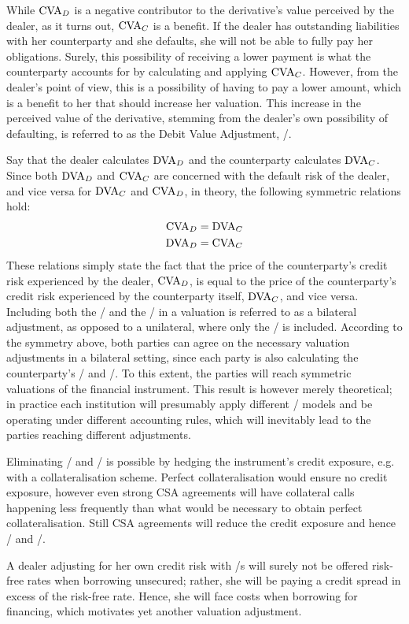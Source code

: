 \documentclass[main.tex]{subfiles}
\begin{document}
        While $\CVA/_{D}$ is a negative contributor to the derivative's value perceived by the dealer, 
        as it turns out, $\CVA/_{C}$ is a benefit.
        If the dealer has outstanding liabilities with her counterparty
        and she defaults, she will not be able to fully pay her obligations. 
        Surely, this possibility of receiving a lower payment is what the counterparty accounts for 
        by calculating and applying $\CVA/_{C}$.
        However, from the dealer's point of view, this is a possibility of having to pay a lower amount,
        which is a benefit to her that should increase her valuation.
        This increase in the perceived value of the derivative,
        stemming from the dealer's own possibility of defaulting, 
        is referred to as the Debit Value Adjustment, \DVA/.

        Say that the dealer calculates $\DVA/_{D}$ and the counterparty calculates $\DVA/_{C}$.
        Since both $\DVA/_{D}$ and $\CVA/_{C}$ are concerned with the default risk of the dealer,
        and vice versa for $\DVA/_{C}$ and $\CVA/_{D}$, in theory, the following symmetric relations hold:
            \begin{align*}
                \CVA/_{D} &= \DVA/_{C} \\
                \DVA/_{D} &= \CVA/_{C}
            \end{align*}
        These relations simply state the fact that
        the price of the counterparty's credit risk experienced by the dealer, $\CVA/_{D}$,
        is equal to the price of the counterparty's credit risk 
        experienced by the counterparty itself, $\DVA/_{C}$, and vice versa.
        Including both the \CVA/ and the \DVA/ in a valuation is referred to as a bilateral adjustment,
        as opposed to a unilateral, where only the \CVA/ is included.
        According to the symmetry above,
        both parties can agree on the necessary valuation adjustments in a bilateral setting,
        since each party is also calculating the counterparty's \CVA/ and \DVA/.
        To this extent, the parties will reach symmetric valuations of the financial instrument. 
        This result is however merely theoretical; 
        in practice each institution will presumably apply different \CVA/ models
        and be operating under different accounting rules, 
        which will inevitably lead to the parties reaching different adjustments. 
        
        Eliminating \CVA/ and \DVA/ is possible by hedging the instrument's credit exposure,
        e.g. with a collateralisation scheme. 
        Perfect collateralisation would ensure no credit exposure,
        however even strong CSA agreements will have collateral calls happening less frequently
        than what would be necessary to obtain perfect collateralisation.
        Still CSA agreements will reduce the credit exposure and hence \CVA/ and \DVA/.

        A dealer adjusting for her own credit risk with \DVA/s
        will surely not be offered risk-free rates when borrowing unsecured;
        rather, she will be paying a credit spread in excess of the risk-free rate.
        Hence, she will face costs when borrowing for financing,
        which motivates yet another valuation adjustment.
\end{document}
